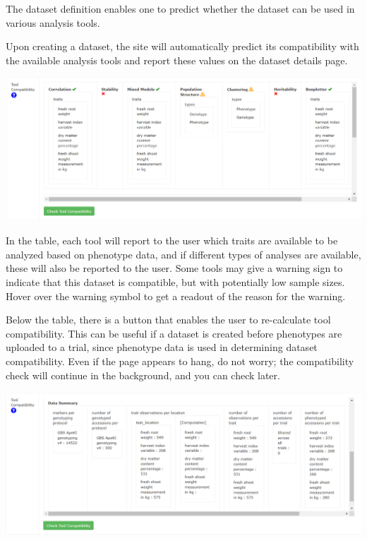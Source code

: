 \documentclass[
  12pt,
]{book}
\begin{document}
The dataset definition enables one to predict whether the dataset can be used in various analysis tools.

Upon creating a dataset, the site will automatically predict its compatibility with the available analysis tools and report these values on the dataset details page.

\begin{center}\includegraphics[width=0.95\linewidth]{assets/images/tool_compatibility_details} \end{center}

In the table, each tool will report to the user which traits are available to be analyzed based on phenotype data, and if different types of analyses are available, these will also be reported to the user. Some tools may give a warning sign to indicate that this dataset is compatible, but with potentially low sample sizes. Hover over the warning symbol to get a readout of the reason for the warning.

Below the table, there is a button that enables the user to re-calculate tool compatibility. This can be useful if a dataset is created before phenotypes are uploaded to a trial, since phenotype data is used in determining dataset compatibility. Even if the page appears to hang, do not worry; the compatibility check will continue in the background, and you can check later.

\begin{center}\includegraphics[width=0.95\linewidth]{assets/images/tool_compatibility_data_summary} \end{center}
\end{document}
